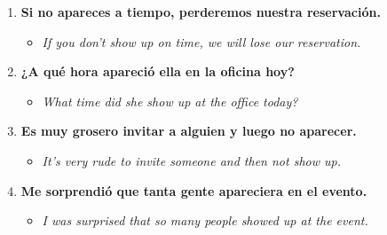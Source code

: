 \documentclass[
10pt, %
a4paper, %
oneside, %
headinclude,footinclude, %
BCOR5mm, %
]{scrartcl}
\begin{document}
\begin{enumerate}
\begin{itemize}
	\end{itemize}
	\item \textbf{Si no apareces a tiempo, perderemos nuestra reservación.}
	\begin{itemize}
		\item \textit{If you don't show up on time, we will lose our reservation.}
	\end{itemize}
	\item \textbf{¿A qué hora apareció ella en la oficina hoy?}
	\begin{itemize}
		\item \textit{What time did she show up at the office today?}
	\end{itemize}
	\item \textbf{Es muy grosero invitar a alguien y luego no aparecer.}
	\begin{itemize}
		\item \textit{It's very rude to invite someone and then not show up.}
	\end{itemize}
	\item \textbf{Me sorprendió que tanta gente apareciera en el evento.}
	\begin{itemize}
		\item \textit{I was surprised that so many people showed up at the event.}
	\end{itemize}
\end{enumerate}


%


\end{document}
